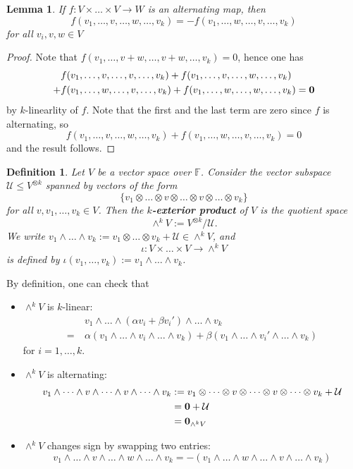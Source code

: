 \documentclass[12pt]{amsbook}
\newtheorem{definition}[theorem]{Definition}
\newtheorem{lemma}[theorem]{Lemma}
\begin{document}
\begin{lemma}
    If $f:V \times \dots \times V \to W$ is an alternating map, then
    $$f(v_1, \dots , v , \dots , w , \dots , v_k) = - f(v_1, \dots , w , \dots , v , \dots , v_k)$$
    for all $v_i, v, w \in V$
\end{lemma}
\begin{proof}
    Note that $f(v_1, \dots, v+w, \dots, v+w, \dots, v_k) = 0$, hence one has
\begin{align*}
&f(v_1, \dots, v, \dots, v, \dots, v_k) + f(v_1, \dots, v, \dots, w, \dots, v_k) \\
+ &f(v_1, \dots, w, \dots, v, \dots, v_k) + f(v_1, \dots, w, \dots, w, \dots, v_k) = {\bf 0}    
\end{align*}
by $k$-linearlity of $f$. Note that the first and the last term are zero since $f$ is alternating, so
$$f(v_1, \dots, v, \dots, w, \dots, v_k) + f(v_1, \dots, w, \dots, v, \dots, v_k) = 0$$    
and the result follows.
\end{proof}

\begin{definition}
Let $V$ be a vector space over $\mathbb{F}$. Consider the vector subspace $\mathcal{U} \leq V^{\otimes k}$ spanned by vectors of the form
$$\{v_1  \otimes  \dots \otimes v \otimes \dots \otimes v \otimes \dots \otimes  v_k\}$$
for all $v, v_1, \dots, v_k \in V$. Then the {\bf $k$-exterior product} of $V$ is the quotient space
$$\wedge^k V := V^{\otimes k}/\mathcal{U}.$$
We write $v_1 \wedge \dots \wedge v_k := v_1 \otimes \dots \otimes v_k + \mathcal{U} \in \wedge^k V$, and 
$$\iota: V \times \dots \times V \to \wedge^k V$$
is defined by $\iota(v_1, \dots, v_k) := v_1 \wedge \dots \wedge v_k$.
\end{definition}

By definition, one can check that 
\begin{itemize}
    \item $\wedge^k V$ is $k$-linear:
    \begin{align*}
&v_1  \wedge  \dots  \wedge (\alpha v_i + \beta v_i' )  \wedge  \dots  \wedge v_k \\
=\ &\alpha(v_1  \wedge  \dots  \wedge v_i  \wedge  \dots  \wedge v_k) + \beta(v_1  \wedge  \dots  \wedge v_i'  \wedge  \dots  \wedge v_k)\end{align*}
for $i = 1, \dots, k.$
\item $\wedge^k V$ is alternating:
\begin{align*}
v_1  \wedge  \dots  \wedge v  \wedge  \dots  \wedge v  \wedge  \dots  \wedge v_k &:= v_1 \otimes  \dots \otimes v \otimes  \dots \otimes v \otimes  \dots \otimes v_k +\mathcal{U} \\
&= {\bf 0} + \mathcal{U}\\
&= {\bf 0}_{\wedge^k V}
\end{align*}
\item $\wedge^k V$ changes sign by swapping two entries:
$$v_1 \wedge  \dots \wedge v \wedge  \dots \wedge w \wedge  \dots \wedge v_k =-(v_1 \wedge  \dots \wedge w \wedge  \dots \wedge v \wedge  \dots \wedge v_k)$$
\end{itemize}
\end{document}
